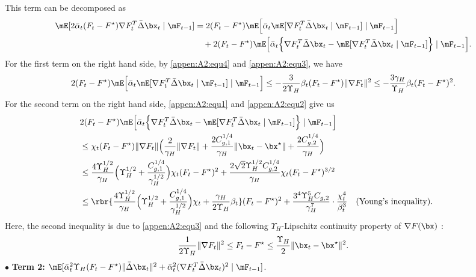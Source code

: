 \noindent This term can be decomposed as
\begin{align*}
\mE[2 \bar{\alpha}_t(F_t-F^\star) \nabla F_t^T \bar{\Delta} \bx_t\mid \mF_{t-1}] & = 2(F_t-F^\star)\mE\Big[\bar{\alpha}_t\mE[\nabla F_t^T\bar{\Delta} \bx_t\mid\mF_{t-1}]\mid \mF_{t-1}\Big]\\
& \quad +2(F_t-F^\star)\mE\Big[\bar{\alpha}_t\Big\{\nabla F_t^T\bar{\Delta}\bx_t-\mE[\nabla F_t^T\bar{\Delta} \bx_t\mid\mF_{t-1}]\Big\}\mid\mF_{t-1}\Big].
\end{align*}
For the first term on the right hand side, by \eqref{appen:A2:equ4} and \eqref{appen:A2:equ3}, we have
\begin{equation}\label{appen:A3:equ3}
2(F_t-F^\star)\mE\Big[\bar{\alpha}_t\mE[\nabla F_t^T\bar{\Delta} \bx_t\mid\mF_{t-1}]\mid \mF_{t-1}\Big]\leq -\frac{3}{2\Upsilon_H}\beta_t(F_t-F^\star)\|\nabla F_t\|^2\leq -\frac{3\gamma_H}{\Upsilon_H}\beta_t(F_t-F^{\star})^2.
 \end{equation}
For the second term on the right hand side, \eqref{appen:A2:equ1} and \eqref{appen:A2:equ2} give us
\begin{align}\label{appen:A3:equ4}
& \hskip-0.6cm  2(F_t-F^\star)\mE\Big[\bar{\alpha}_t\Big\{\nabla F_t^T\bar{\Delta}\bx_t-\mE[\nabla F_t^T\bar{\Delta} \bx_t\mid\mF_{t-1}]\Big\}\mid\mF_{t-1}\Big] \nonumber\\
&\hskip-0.6cm \leq \chi_t(F_t-F^\star) \|\nabla F_t\|\Big(\frac{2}{\gamma_H}\|\nabla F_t\| +\frac{2C_{g,1}^{1/4}}{\gamma_H}\|\bx_t-\bx^\star\| + \frac{2C_{g,2}^{1/4}}{\gamma_H}\Big) \nonumber\\
&\hskip-0.6cm \leq \frac{4\Upsilon_H^{1/2}}{\gamma_H}\Big(\Upsilon_H^{1/2}+ \frac{C_{g,1}^{1/4}}{\gamma_H^{1/2}}\Big)\chi_t(F_t-F^\star)^2 + \frac{2\sqrt{2}\Upsilon_H^{1/2}C_{g,2}^{1/4}}{\gamma_H}\chi_t(F_t-F^\star)^{3/2} \nonumber\\
&\hskip-0.6cm \leq \rbr{\frac{4\Upsilon_H^{1/2}}{\gamma_H}\Big(\Upsilon_H^{1/2}+ \frac{C_{g,1}^{1/4}}{\gamma_H^{1/2}}\Big)\chi_t+ \frac{\gamma_H}{2\Upsilon_H}\beta_t}(F_t-F^\star)^2 + \frac{3^4\Upsilon_H^5C_{g,2}}{\gamma_H^7}\cdot\frac{\chi_t^4}{\beta_t^3}\quad \text{(Young's inequality)}.
\end{align}
Here, the second inequality is due to \eqref{appen:A2:equ3} and the following $\Upsilon_H$-Lipschitz continuity property of $\nabla F(\bx)$ \citep{Nesterov2018Lectures}:
\begin{equation}\label{appen:A3:equ2}
\frac{1}{2\Upsilon_{H}}\|\nabla F_t\|^2\leq F_t-F^{\star}\leq \frac{\Upsilon_{H}}{2}\|\bx_t-\bx^\star\|^2.
\end{equation}
\noindent$\bullet$ \textbf{Term 2:} $\mE[\bar{\alpha}_t^2 \Upsilon_{H}(F_t-F^\star)\|\bar{\Delta} \bx_t\|^2+\bar{\alpha}_t^2(\nabla F_t^{T} \bar{\Delta} \bx_t)^2\mid \mF_{t-1}]$.


